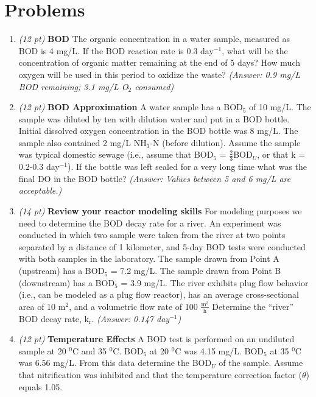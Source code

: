 \documentclass[12pt,letterpaper]{article}
\begin{document}
\section *{Problems}
\begin{enumerate}


\item \emph{(12 pt)} \textbf{BOD} The organic concentration in a water sample, measured as BOD is 4 mg/L.  If the BOD reaction rate is 0.3 day$^{-1}$, what will be the concentration of organic matter remaining at the end of 5 days?  How much oxygen will be used in this period to oxidize the waste? \emph{(Answer: 0.9 mg/L BOD remaining; 3.1 mg/L O$_2$ consumed)}
 
\item \emph{(12 pt)}  \textbf{BOD Approximation} A water sample has a BOD$_5$ of 10 mg/L. The sample was diluted by ten with dilution water and put in a BOD bottle.    Initial dissolved oxygen concentration in the BOD bottle was 8 mg/L.  The sample also contained 2 mg/L NH$_3$-N (before dilution).  Assume the sample was typical domestic sewage (i.e., assume that BOD$_5$ = $\frac{2}{3}$BOD$_U$, or that k = 0.2-0.3 day$^{-1}$).  If the bottle was left sealed for a very long time what was the final DO in the BOD bottle? \emph{(Answer: Values between 5 and 6 mg/L are acceptable.)}


\item \emph{(14 pt)} \textbf{Review your reactor modeling skills} For modeling purposes we need to determine the BOD decay rate for a river.  An experiment was conducted in which two sample were taken from the river at two points separated by a distance of 1 kilometer, and 5-day BOD tests were conducted with both samples in the laboratory.  The sample drawn from Point A (upstream) has a BOD$_5$ = 7.2 mg/L.  The sample drawn from Point B (downstream) has a BOD$_5$ = 3.9 mg/L.  The river exhibits plug flow behavior (i.e., can be modeled as a plug flow reactor), has an average cross-sectional area of 10 m$^2$, and a volumetric flow rate of 100 $\mathrm{\frac{m^3}{h}}$   Determine the “river” BOD decay rate, k$\mathrm{_r}$. \emph{(Answer: 0.147 day$^{-1}$)}


\item \emph{(12 pt)} \textbf{Temperature Effects} A BOD test is performed on an undiluted sample at 20 $^0$C and 35 $^0$C.  BOD$_5$ at 20 $^0$C was 4.15 mg/L.  BOD$_5$ at 35 $^0$C was 6.56 mg/L.  From this data determine the BOD$_U$ of the sample.  Assume that nitrification was inhibited and that the temperature correction factor ($\theta$) equals 1.05.


\end{enumerate}
\end{document}
